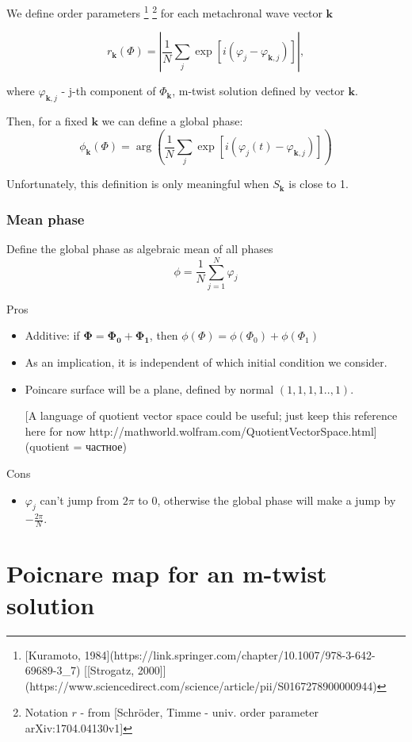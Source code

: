 \documentclass[a4paper,12pt]{article}
\renewcommand*{\vec}[1]{\mathbf{#1}}
\newcommand*{\F}{\Phi} %
\begin{document}
We define order parameters
\footnote{[Kuramoto, 1984](https://link.springer.com/chapter/10.1007/978-3-642-69689-3\_7)  [[Strogatz, 2000]](https://www.sciencedirect.com/science/article/pii/S0167278900000944)}
\footnote{Notation $r$ - from [Schröder, Timme - univ. order parameter arXiv:1704.04130v1]}
for each metachronal wave vector $\mathbf{k}$

$$r_\vec{k}(\F) = \left| \frac{1}{N}\sum_j \exp\left[ i ( \varphi_j - \varphi_{\vec{k},j} ) \right] \right|,$$

where $\varphi_{\vec{k},j}$ - j-th component of $\Phi_\vec{k}$, m-twist solution defined by vector $\vec{k}$.

Then, for a fixed $\vec{k}$ we can define a global phase:
$$\phi_{\vec{k}}(\F) = \arg \left( \frac{1}{N}\sum_j \exp\left[ i ( \varphi_j(t) - \varphi_{\vec{k},j} ) \right] \right) $$

Unfortunately, this definition is only meaningful when $S_\vec{k}$ is close to 1.

\subsubsection{Mean phase}

Define the global phase as algebraic mean of all phases
$$
\phi =  \frac{1}{N}\sum_{j=1}^{N} \varphi_j
$$

Pros
\begin{itemize}

\item Additive: if $\mathbf{\Phi} = \mathbf{\F_0}+ \mathbf{\F_1} $, then $\phi(\F) = \phi(\F_0) + \phi(\F_1)$
\item As an implication, it is independent of which initial condition we consider.
\item Poincare surface will be a plane, defined by normal $(1,1,1,1..,1)$.

  [A language of quotient vector space could be useful; just keep this reference here for now http://mathworld.wolfram.com/QuotientVectorSpace.html]
  (quotient = частное)

\end{itemize}

Cons
\begin{itemize}
\item $\varphi_j$ can't jump from  $2 \pi$ to $0$, otherwise the global phase will make a jump by $- \frac{2 \pi}{N}$.
\end{itemize}


\section{Poicnare map for an m-twist solution}
\end{document}
